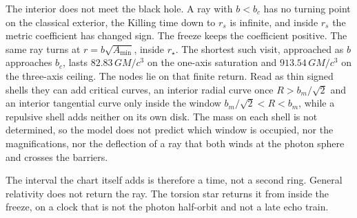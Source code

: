 \documentclass[a4paper]{article}
\begin{document}
The interior does not meet the black hole. A ray with \(b<b_c\) has no turning point on the classical exterior, the Killing time down to \(r_s\) is infinite, and inside \(r_s\) the metric coefficient has changed sign. The freeze keeps the coefficient positive. The same ray turns at \(r=b\sqrt{A_{\min}}\), inside \(r_\star\). The shortest such visit, approached as \(b\) approaches \(b_c\), lasts \(82.83\,GM/c^3\) on the one-axis saturation and \(913.54\,GM/c^3\) on the three-axis ceiling. The nodes lie on that finite return. Read as thin signed shells they can add critical curves, an interior radial curve once \(R>b_m/\sqrt{2}\) and an interior tangential curve only inside the window \(b_m/\sqrt{2}<R<b_m\), while a repulsive shell adds neither on its own disk. The mass on each shell is not determined, so the model does not predict which window is occupied, nor the magnifications, nor the deflection of a ray that both winds at the photon sphere and crosses the barriers.

The interval the chart itself adds is therefore a time, not a second ring. General relativity does not return the ray. The torsion star returns it from inside the freeze, on a clock that is not the photon half-orbit and not a late echo train.
\end{document}
